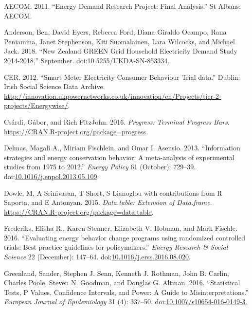 \documentclass[]{article}
\theoremstyle{definition}
\theoremstyle{definition}
\theoremstyle{definition}
\theoremstyle{remark}
\begin{document}
\hypertarget{refs}{}
\hypertarget{ref-AECOM2011Energy}{}
AECOM. 2011. ``Energy Demand Research Project: Final Analysis.'' St
Albans: AECOM.

\hypertarget{ref-anderson_new_2018}{}
Anderson, Ben, David Eyers, Rebecca Ford, Diana Giraldo Ocampo, Rana
Peniamina, Janet Stephenson, Kiti Suomalainen, Lara Wilcocks, and
Michael Jack. 2018. ``New Zealand GREEN Grid Household Electricity
Demand Study 2014-2018,'' September.
doi:\href{https://doi.org/10.5255/UKDA-SN-853334}{10.5255/UKDA-SN-853334}.

\hypertarget{ref-CER2012Smart}{}
CER. 2012. ``Smart Meter Electricity Consumer Behaviour Trial data.''
Dublin: Irish Social Science Data Archive.
\url{http://innovation.ukpowernetworks.co.uk/innovation/en/Projects/tier-2-projects/Energywise/}.

\hypertarget{ref-progress}{}
Csárdi, Gábor, and Rich FitzJohn. 2016. \emph{Progress: Terminal
Progress Bars}. \url{https://CRAN.R-project.org/package=progress}.

\hypertarget{ref-Delmas2013Information}{}
Delmas, Magali A., Miriam Fischlein, and Omar I. Asensio. 2013.
``Information strategies and energy conservation behavior: A
meta-analysis of experimental studies from 1975 to 2012.'' \emph{Energy
Policy} 61 (October): 729--39.
doi:\href{https://doi.org/10.1016/j.enpol.2013.05.109}{10.1016/j.enpol.2013.05.109}.

\hypertarget{ref-data.table}{}
Dowle, M, A Srinivasan, T Short, S Lianoglou with contributions from R
Saporta, and E Antonyan. 2015. \emph{Data.table: Extension of
Data.frame}. \url{https://CRAN.R-project.org/package=data.table}.

\hypertarget{ref-Frederiks2016Evaluating}{}
Frederiks, Elisha R., Karen Stenner, Elizabeth V. Hobman, and Mark
Fischle. 2016. ``Evaluating energy behavior change programs using
randomized controlled trials: Best practice guidelines for
policymakers.'' \emph{Energy Research \& Social Science} 22 (December):
147--64.
doi:\href{https://doi.org/10.1016/j.erss.2016.08.020}{10.1016/j.erss.2016.08.020}.

\hypertarget{ref-Greenland2016}{}
Greenland, Sander, Stephen J. Senn, Kenneth J. Rothman, John B. Carlin,
Charles Poole, Steven N. Goodman, and Douglas G. Altman. 2016.
``Statistical Tests, P Values, Confidence Intervals, and Power: A Guide
to Misinterpretations.'' \emph{European Journal of Epidemiology} 31 (4):
337--50.
doi:\href{https://doi.org/10.1007/s10654-016-0149-3}{10.1007/s10654-016-0149-3}.
\end{document}
